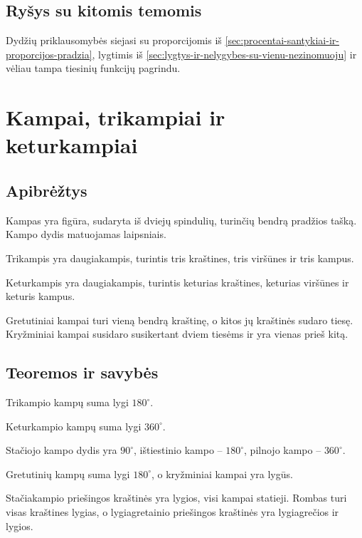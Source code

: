 \subsection{Ryšys su kitomis temomis}
Dydžių priklausomybės siejasi su proporcijomis iš \ref{sec:procentai-santykiai-ir-proporcijos-pradzia}, lygtimis iš \ref{sec:lygtys-ir-nelygybes-su-vienu-nezinomuoju} ir vėliau tampa tiesinių funkcijų pagrindu.

\section{Kampai, trikampiai ir keturkampiai}\label{sec:kampai-trikampiai-ir-keturkampiai}

\subsection{Apibrėžtys}
\begin{apibreztis}
Kampas yra figūra, sudaryta iš dviejų spindulių, turinčių bendrą pradžios tašką. Kampo dydis matuojamas laipsniais.
\end{apibreztis}
\begin{apibreztis}
Trikampis yra daugiakampis, turintis tris kraštines, tris viršūnes ir tris kampus.
\end{apibreztis}
\begin{apibreztis}
Keturkampis yra daugiakampis, turintis keturias kraštines, keturias viršūnes ir keturis kampus.
\end{apibreztis}
\begin{apibreztis}
Gretutiniai kampai turi vieną bendrą kraštinę, o kitos jų kraštinės sudaro tiesę. Kryžminiai kampai susidaro susikertant dviem tiesėms ir yra vienas prieš kitą.
\end{apibreztis}

\subsection{Teoremos ir savybės}
\begin{teorema}
Trikampio kampų suma lygi \(180^\circ\).
\end{teorema}
\begin{teorema}
Keturkampio kampų suma lygi \(360^\circ\).
\end{teorema}
\begin{savybe}
Stačiojo kampo dydis yra \(90^\circ\), ištiestinio kampo -- \(180^\circ\), pilnojo kampo -- \(360^\circ\).
\end{savybe}
\begin{savybe}
Gretutinių kampų suma lygi \(180^\circ\), o kryžminiai kampai yra lygūs.
\end{savybe}
\begin{savybe}
Stačiakampio priešingos kraštinės yra lygios, visi kampai statieji. Rombas turi visas kraštines lygias, o lygiagretainio priešingos kraštinės yra lygiagrečios ir lygios.
\end{savybe}

